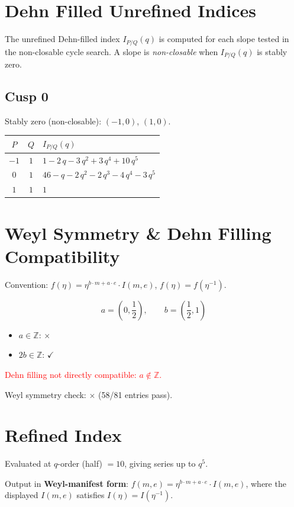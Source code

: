\documentclass[11pt,a4paper]{article}
\begin{document}
\section{Dehn Filled Unrefined Indices}
The unrefined Dehn-filled index $I_{P/Q}(q)$ is computed for each slope tested in the non-closable cycle search.  A slope is \emph{non-closable} when $I_{P/Q}(q)$ is stably zero.

\subsection*{Cusp 0}
Stably zero (non-closable): $(-1,0)$, $(1,0)$.

\begin{longtable}{ccl}
\toprule
$P$ & $Q$ & $I_{P/Q}(q)$ \\
\midrule
\endhead
$-1$ & $1$ & $1 - 2\,q - 3\,q^{2} + 3\,q^{4} + 10\,q^{5}$ \\
$0$ & $1$ & $46 - q - 2\,q^{2} - 2\,q^{3} - 4\,q^{4} - 3\,q^{5}$ \\
$1$ & $1$ & $1$ \\
\bottomrule
\end{longtable}

\section{Weyl Symmetry \& Dehn Filling Compatibility}
Convention: $f(\eta) = \eta^{b\cdot m + a\cdot e} \cdot I(m,e)$, \quad $f(\eta) = f(\eta^{-1})$.

$$a = (0, \frac{1}{2}), \qquad b = (\frac{1}{2}, 1)$$

\begin{itemize}
  \item $a \in \mathbb{Z}$: $\times$
  \item $2b \in \mathbb{Z}$: $\checkmark$
\end{itemize}
\textcolor{red}{Dehn filling not directly compatible: $a \notin \mathbb{Z}$.}

Weyl symmetry check: $\times$ (58/81 entries pass).

\section{Refined Index}
Evaluated at $q$-order (half) $= 10$, giving series up to $q^{5}$.

Output in \textbf{Weyl-manifest form}: $f(m,e) = \eta^{b\cdot m + a\cdot e}\cdot I(m,e)$, where the displayed $I(m,e)$ satisfies $I(\eta) = I(\eta^{-1})$.
\end{document}
